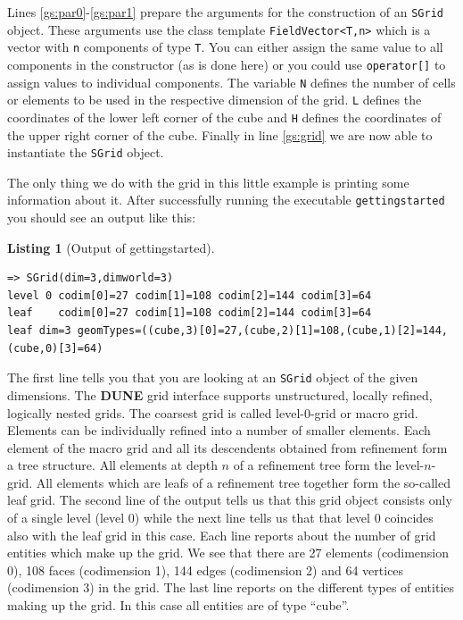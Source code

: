 \documentclass[11pt,a4paper,headinclude,footinclude,DIV16,normalheadings]{scrreprt}
\newcommand{\Dune}{{\sf\bfseries DUNE}\xspace}
\newtheorem{lst}{Listing}
\begin{document}
Lines \ref{gs:par0}-\ref{gs:par1} prepare the arguments for the
construction of an \lstinline!SGrid! object. These arguments use the
class template \lstinline!FieldVector<T,n>! which is a vector with
\lstinline!n!  components of type \lstinline!T!. You can either assign
the same value to all components in the constructor (as is done here)
or you could use \lstinline!operator[]! to assign values to individual
components.  The variable \lstinline!N! defines the number of cells or
elements to be used in the respective dimension of the grid.
\lstinline!L! defines the coordinates of the lower left corner of the
cube and \lstinline!H!  defines the coordinates of the upper right corner of the cube.
Finally in line \ref{gs:grid} we are now able to
instantiate the \lstinline!SGrid!  object.

The only thing we do with the grid in this little example is printing
some information about it. After successfully running the executable
\lstinline!gettingstarted! you should see an output like this:

\begin{lst}[Output of gettingstarted] \mbox{}

\begin{lstlisting}[basicstyle=\ttfamily\scriptsize]
=> SGrid(dim=3,dimworld=3)
level 0 codim[0]=27 codim[1]=108 codim[2]=144 codim[3]=64
leaf    codim[0]=27 codim[1]=108 codim[2]=144 codim[3]=64
leaf dim=3 geomTypes=((cube,3)[0]=27,(cube,2)[1]=108,(cube,1)[2]=144,(cube,0)[3]=64)
\end{lstlisting}
\end{lst}

The first line tells you that you are looking at an \lstinline!SGrid!
object of the given dimensions. The \Dune{} grid interface supports
unstructured, locally refined, logically nested grids. The coarsest
grid is called level-0-grid or macro grid. Elements can be
individually refined into a number of smaller elements. Each element
of the macro grid and all its descendents obtained from refinement
form a tree structure. All elements at depth $n$ of a refinement tree
form the level-$n$-grid. All elements which are leafs of a refinement
tree together form the so-called leaf grid. The second line of the
output tells us that this grid object consists only of a single level
(level $0$) while the next line tells us that that level 0 coincides
also with the leaf grid in this case. Each line reports about the
number of grid entities which make up the grid. We see that there are
27 elements (codimension 0), 108 faces (codimension 1), 144 edges
(codimension 2) and 64 vertices (codimension 3) in the grid. The last
line reports on the different types of entities making up the grid. In
this case all entities are of type ``cube''.
\end{document}
